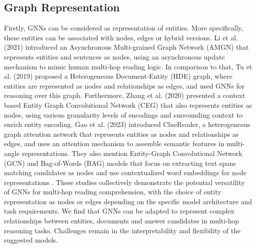 \documentclass[sigplan,screen,nonacm]{acmart}
\begin{document}
\subsection{Graph Representation}
Firstly, GNNs can be considered as representation of entities. More specifically, these entities can be associated with nodes, edges or hybrid versions. 
Li et al. (2021) \cite{RN131} introduced an Asynchronous Multi-grained Graph Network (AMGN) that represents entities and sentences as nodes, using an asynchronous 
update mechanism to mimic human multi-hop reading logic. In comparison to that, Tu et al. (2019) \cite{RN124} proposed a Heterogeneous Document-Entity (HDE) 
graph, where entities are represented as nodes and relationships as edges, and used GNNs for reasoning over this graph. Furthermore, Zhang et al. (2020) \cite{RN170} presented 
a context based Entity Graph Convolutional Network (CEG) that also represents entities as nodes, using various granularity levels of encodings and surrounding context to enrich entity encoding. Gao et al. (2023) \cite{RN136} introduced ClueReader, a heterogeneous graph attention network that represents entities as nodes and
relationships as edges, and uses an attention mechanism to assemble semantic features in multi-angle representations. They also mention Entity-Graph 
Convolutional Network (GCN) and Bag-of-Words (BAG) models that focus on extracting text spans matching candidates as nodes and use contextualized word embeddings
for node representations \cite{RN136}. These studies collectively demonstrate the potential versatility of GNNs for multi-hop reading comprehension, with the
choice of entity representation as nodes or edges depending on the specific model architecture and task requirements. We find that GNNs can be adapted
to represent complex relationships between entities, documents and answer candidates in multi-hop reasoning tasks. Challenges remain in the 
interpretability and flexibility of the suggested models.
\end{document}
